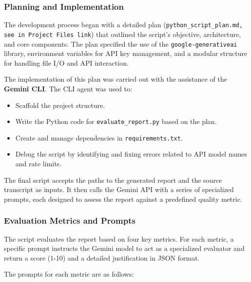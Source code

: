 \subsubsection{Planning and Implementation}

The development process began with a detailed plan (\texttt{python\_script\_plan.md, see in Project Files link}) that outlined the script's objective, architecture, and core components. The plan specified the use of the \texttt{google-generativeai} library, environment variables for API key management, and a modular structure for handling file I/O and API interaction.

The implementation of this plan was carried out with the assistance of the \textbf{Gemini CLI}. The CLI agent was used to:
\begin{itemize}
    \item Scaffold the project structure.
    \item Write the Python code for \texttt{evaluate\_report.py} based on the plan.
    \item Create and manage dependencies in \texttt{requirements.txt}.
    \item Debug the script by identifying and fixing errors related to API model names and rate limits.
\end{itemize}

The final script accepts the paths to the generated report and the source transcript as inputs. It then calls the Gemini API with a series of specialized prompts, each designed to assess the report against a predefined quality metric.

\subsubsection{Evaluation Metrics and Prompts}

The script evaluates the report based on four key metrics. For each metric, a specific prompt instructs the Gemini model to act as a specialized evaluator and return a score (1-10) and a detailed justification in JSON format.

The prompts for each metric are as follows:

